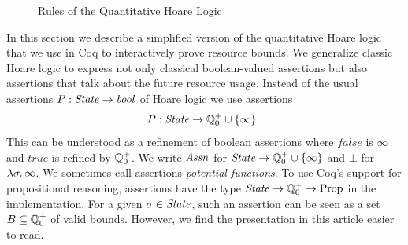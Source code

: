 \documentclass[nocopyrightspace,preprint,pldi]{sigplanconf-pldi15}
\begin{document}
{\begin{figure}

\caption{Rules of the Quantitative Hoare Logic}
\label{fig:logicapp}
\end{figure}

In this section we describe a simplified version of the quantitative
Hoare logic that we use in Coq to interactively prove resource bounds.
%
We generalize classic Hoare logic to express not only classical
boolean-valued assertions but also assertions that talk about the
future resource usage.  Instead of the usual assertions $P : \mathit{State}
\to \mathit{bool}$ of Hoare logic we use assertions
$$
P : \mathit{State} \to \mathbb Q^+_0 \cup \{ \infty \} \; .
$$
This can be understood as a refinement of boolean assertions where
$\mathit{false}$ is $\infty$ and $\mathit{true}$ is refined by $\mathbb Q^+_0$.
We write $\mathit{Assn}$ for $\mathit{State} \to \mathbb Q^+_0 \cup \{ \infty \}$ and $\bot$ for
$\lambda \sigma . \, \infty$.  We sometimes call assertions
\emph{potential functions}.  To use Coq's support for propositional
reasoning, assertions have the type $\mathit{State} \to \mathbb Q^+_0 \to \mathrm{Prop}$
in the implementation.  For a given $\sigma \in \mathit{State}$, such an
assertion can be seen as a set $B \subseteq \mathbb Q^+_0$ of valid bounds.
However, we find the presentation in this article easier to read.

}
\end{document}

